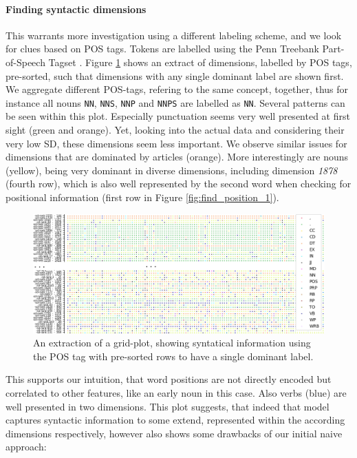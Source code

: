 \paragraph*{Finding syntactic dimensions}
This warrants more investigation using a different labeling scheme, and we look for clues based on \ac{POS} tags. Tokens are labelled using the Penn Treebank Part-of-Speech Tagset \citep{marcus1993building}. Figure \ref{fig:find_syntax} shows an extract of dimensions, labelled by \ac{POS} tags, pre-sorted, such that dimensions with any single dominant label are shown first. We aggregate different \ac{POS}-tags, refering to the same concept, together, thus for instance all nouns \texttt{NN}, \texttt{NNS}, \texttt{NNP} and \texttt{NNPS} are labelled as \texttt{NN}. Several patterns can be seen within this plot. Especially punctuation seems very well presented at first sight (green and orange). Yet, looking into the actual data and considering their very low \ac{SD}, these dimensions seem less important. We observe similar issues for dimensions that are dominated by articles (orange). More interestingly are nouns (yellow), being very dominant in diverse dimensions, including dimension \textit{1878} (fourth row), which is also well represented by the second word when checking for positional information (first row in Figure \ref{fig:find_position_1}). 
\begin{figure}[tph!]
\centering
	\includegraphics[totalheight=7cm]{fig/finsynpos3.png}
	\caption{An extraction of a grid-plot, showing syntatical information using the \ac{POS} tag with pre-sorted rows to have a single dominant label.}
	\label{fig:find_syntax}
\end{figure}
\noindent
This supports our intuition, that word positions are not directly encoded but correlated to other features, like an early noun in this case. Also verbs (blue) are well presented in two dimensions. This plot suggests, that indeed that model captures syntactic information to some extend, represented within the according dimensions respectively, however also shows some drawbacks of our initial naive approach:
